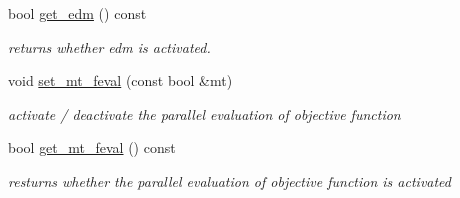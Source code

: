 \begin{DoxyCompactItemize}
bool \hyperlink{classlibcmaes_1_1Parameters_a3fa757be9e734622d77a831b3576aedb}{get\-\_\-edm} () const 
\begin{DoxyCompactList}\small\item\em returns whether edm is activated. \end{DoxyCompactList}\item 
void \hyperlink{classlibcmaes_1_1Parameters_a72995fb64587e6401d8b751343750c65}{set\-\_\-mt\-\_\-feval} (const bool \&mt)
\begin{DoxyCompactList}\small\item\em activate / deactivate the parallel evaluation of objective function \end{DoxyCompactList}\item 
bool \hyperlink{classlibcmaes_1_1Parameters_aac3914b24de6312e6d1fe3d493bb42f5}{get\-\_\-mt\-\_\-feval} () const 
\begin{DoxyCompactList}\small\item\em resturns whether the parallel evaluation of objective function is activated \end{DoxyCompactList}\end{DoxyCompactItemize}
